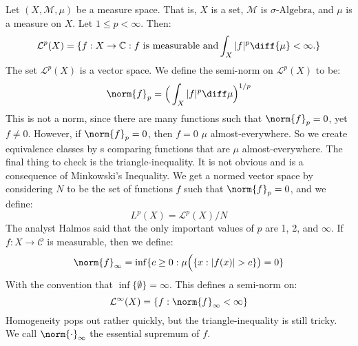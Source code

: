\documentclass[crop=false,class=article,oneside]{standalone}
\begin{document}
            \begin{lexample}
                Let $(X,\mathcal{M},\mu)$ be a measure space. That is,
                $X$ is a set, $\mathcal{M}$ is $\sigma\textrm{-Algebra}$, and
                $\mu$ is a measure on $X$. Let $1\leq{p}<\infty$. Then:
                \begin{equation}
                    \mathcal{L}^{p}(X)=
                    \{f:X\rightarrow\mathbb{C}:
                    f\textrm{ is measurable and}
                    \int_{X}|f|^{p}\diff{\mu}<\infty.\}
                \end{equation}
                The set $\mathcal{L}^{p}(X)$ is a vector space. We define
                the semi-norm on $\mathcal{L}^{p}(X)$ to be:
                \begin{equation}
                    \norm{f}_{p}=
                    \Big(\int_{X}|f|^{p}\diff\mu\Big)^{1/p}
                \end{equation}
                This is not a norm, since there are many functions such that
                $\norm{f}_{p}=0$, yet $f\ne{0}$. However, if
                $\norm{f}_{p}=0$, then $f=0$ $\mu$ almost-everywhere. So
                we create equivalence classes by s comparing functions that
                are $\mu$ almost-everywhere. The final thing to check
                is the triangle-inequality. It is not obvious and is a
                consequence of Minkowski's Inequality. We get a normed vector
                space by considering $N$ to be the set of functions $f$
                such that $\norm{f}_{p}=0$, and we define:
                \begin{equation}
                    L^{p}(X)=\mathcal{L}^{p}(X)/N
                \end{equation}
                The analyst Halmos said that the only important values of
                $p$ are 1, 2, and $\infty$. If $f:X\rightarrow\mathcal{C}$ is
                measurable, then we define:
                \begin{equation}
                    \norm{f}_{\infty}=
                    \inf\{c\geq{0}:\mu\Big(\{x:|f(x)|>c\}\big)=0\}
                \end{equation}
                With the convention that $\inf\{\emptyset\}=\infty$.
                This defines a semi-norm on:
                \begin{equation}
                    \mathcal{L}^{\infty}(X)=\{f:\norm{f}_{\infty}<\infty\}
                \end{equation}
                Homogeneity pops out rather quickly, but the
                triangle-inequality is still tricky. We call
                $\norm{\cdot}_{\infty}$ the essential supremum of $f$.
            \end{lexample}
\end{document}
